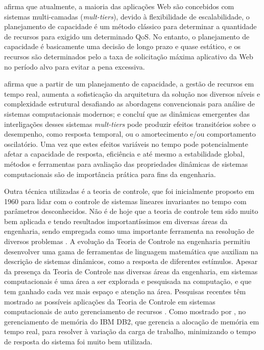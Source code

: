 \cite{Dong2014} afirma que atualmente, a maioria das aplicações Web são concebidos com sistemas multi-camadas (\textit{mult-tiers}), devido à flexibilidade de escalabilidade, o planejamento de capacidade é um método clássico para determinar a quantidade de recursos para exigido um determinado QoS. No entanto, o planejamento de capacidade é basicamente uma decisão de longo prazo e quase estático, e os recursos são determinados pelo a taxa de solicitação máxima aplicativo da Web no período alvo para evitar a pena excessiva.

\cite{Lourenco2015} afirma que a partir de um planejamento de capacidade, a gestão de recursos em tempo real, aumenta a sofisticação da arquitetura da solução nos diversos níveis e complexidade estrutural desafiando as abordagens convencionais para análise de sistemas computacionais modernos; e concluí que as dinâmicas emergentes das interligações desses sistemas \textit{mult-tiers} pode produzir efeitos transitórios sobre o desempenho, como resposta temporal, ou o amortecimento e/ou comportamento oscilatório. Uma vez que estes efeitos variáveis no tempo pode potencialmente afetar a capacidade de resposta, eficiência e até mesmo a estabilidade global, métodos e ferramentas para avaliação das propriedades dinâmicas de sistemas computacionais são de importância prática para fins da engenharia.

Outra técnica utilizadas é a teoria de controle, que foi inicialmente proposto em 1960 para lidar com o controle de sistemas lineares invariantes no tempo com parâmetros desconhecidos. Não é de hoje que a teoria de controle tem sido muito bem aplicada e tendo resultados importantíssimos em diversas áreas da engenharia, sendo empregada como uma importante ferramenta na resolução de diversos problemas \cite{Ogata2001}. A evolução da Teoria de Controle na engenharia permitiu desenvolver uma gama de ferramentas de linguagem matemática que auxiliam na descrição de sistemas dinâmicos, como a resposta de diferentes estímulos. Apesar da presença da Teoria de Controle nas diversas áreas da engenharia, em sistemas computacionais é uma área a ser explorada e pesquisada na computação, e que tem ganhado cada vez mais espaço e atenção na área. Pesquisas recentes têm mostrado as possíveis aplicações da Teoria de Controle em sistemas computacionais de auto gerenciamento de recursos \cite{Nobile2013}. Como mostrado por \cite{Abdelzaher2008}, no gerenciamento de memória do IBM DB2, que gerencia a alocação de memória em tempo real, para resolver à variação da carga de trabalho, minimizando o tempo de resposta do sistema foi muito bem utilizada.

